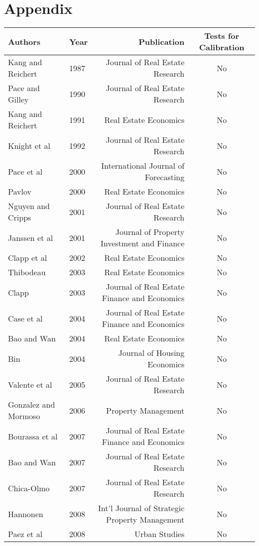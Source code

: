 \documentclass[colTwo]{anon}
\theoremstyle{definition}
\begin{document}
\section{Appendix}

\begin{table*}[h!]
\centering
\begin{tabular}{|l|l|r|c|}
\hline
\textbf{Authors} & \textbf{Year} & \textbf{Publication} & \textbf{Tests for Calibration}\\
\hline
Kang and Reichert & 1987 & Journal of Real Estate Research & No \\
Pace and Gilley & 1990 & Journal of Real Estate Research & No \\
Kang and Reichert & 1991 & Real Estate Economics & No \\
Knight et al & 1992 & Journal of Real Estate Research & No \\
Pace et al & 2000 & International Journal of Forecasting & No \\
Pavlov & 2000 & Real Estate Economics & No \\
Nguyen and Cripps & 2001 & Journal of Real Estate Research & No \\
Janssen et al & 2001 & Journal of Property Investment and Finance & No \\
Clapp et al & 2002 & Real Estate Economics & No \\
Thibodeau & 2003 & Real Estate Economics & No \\
Clapp & 2003 & Journal of Real Estate Finance and Economics & No \\
Case et al & 2004 & Journal of Real Estate Finance and Economics & No \\
Bao and Wan & 2004 & Real Estate Economics & No \\
Bin & 2004 & Journal of Housing Economics & No \\
Valente et al & 2005 & Journal of Real Estate Research & No \\
Gonzalez and Mormoso & 2006 & Property Management & No \\
Bourassa et al & 2007 & Journal of Real Estate Finance and Economics & No \\
Bao and Wan & 2007 & Journal of Real Estate Research & No \\
Chica-Olmo & 2007 & Journal of Real Estate Research & No \\
Hannonen & 2008 & Int'l Journal of Strategic Property Management & No \\
Paez et al & 2008 & Urban Studies & No \\

\end{tabular}
\end{table*}
\end{document}

